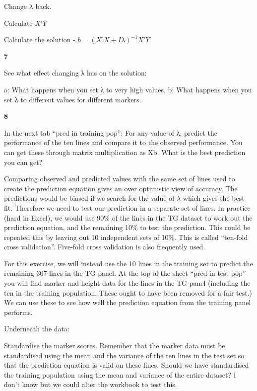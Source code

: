 \documentclass[
]{book}
\makeatletter
\newenvironment{kframe}{%
\medskip{}
\setlength{\fboxsep}{.8em}
 \def\at@end@of@kframe{}%
 \ifinner\ifhmode%
  \def\at@end@of@kframe{\end{minipage}}%
  \begin{minipage}{\columnwidth}%
 \fi\fi%
 \def\FrameCommand##1{\hskip\@totalleftmargin \hskip-\fboxsep
 \colorbox{shadecolor}{##1}\hskip-\fboxsep
     \hskip-\linewidth \hskip-\@totalleftmargin \hskip\columnwidth}%
 \MakeFramed {\advance\hsize-\width
   \@totalleftmargin\z@ \linewidth\hsize
   \@setminipage}}%
 {\par\unskip\endMakeFramed%
 \at@end@of@kframe}
\newenvironment{rmdblock}[1]
  {
  \begin{itemize}
  \renewcommand{\labelitemi}{
    \raisebox{-.7\height}[0pt][0pt]{
      {\setkeys{Gin}{width=3em,keepaspectratio}\texttt{[image: images/\#1]}}
    }
  }
  \setlength{\fboxsep}{1em}
  \begin{kframe}
  \item
  }
  {
  \end{kframe}
  \end{itemize}
  }
\newenvironment{rmdquiz}
  {\begin{rmdblock}{quiz}}
  {\end{rmdblock}}
\makeatother
\begin{document}
Change \(λ\) back.

Calculate \(X’Y\)

Calculate the solution - \(b = (X’X+Iλ)^{-1} X’Y\)

\begin{rmdquiz}
\textbf{7}

See what effect changing λ has on the solution:

a: What happens when you set λ to very high values.
b: What happens when you set λ to different values for different markers.
\end{rmdquiz}

\begin{rmdquiz}
\textbf{8}

In the next tab ``pred in training pop'': For any value of λ, predict the performance of the ten lines and compare it to the observed performance. You can get these through matrix multiplication as Xb. What is the best prediction you can get?
\end{rmdquiz}

Comparing observed and predicted values with the same set of lines used to create the prediction equation gives an over optimistic view of accuracy. The predictions would be biased if we search for the value of \(λ\) which gives the best fit. Therefore we need to test our prediction in a separate set of lines. In practice (hard in Excel), we would use 90\% of the lines in the TG dataset to work out the prediction equation, and the remaining 10\% to test the prediction. This could be repeated this by leaving out 10 independent sets of 10\%. This is called ``ten-fold cross validation''. Five-fold cross validation is also frequently used.

For this exercise, we will instead use the 10 lines in the training set to predict the remaining 307 lines in the TG panel. At the top of the sheet ``pred in test pop'' you will find marker and height data for the lines in the TG panel (including the ten in the training population. These ought to have been removed for a fair test.) We can use these to see how well the prediction equation from the training panel performs.

Underneath the data:

Standardise the marker scores. Remember that the marker data must be standardised using the mean and the variance of the ten lines in the test set so that the prediction equation is valid on these lines. Should we have standardised the training population using the mean and variance of the entire dataset? I don't know but we could alter the workbook to test this.
\end{document}
